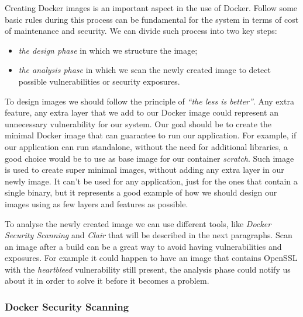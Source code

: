 \documentclass[a4paper,12pt]{article}
\begin{document}
Creating Docker images is an important aspect in the use of Docker. Follow
some basic rules during this process can be fundamental for the system in terms
of cost of maintenance and security. We can divide such process into two key
steps: 
\begin{itemize}
  \item \textit{the design phase} in which we structure the image;
  \item \textit{the analysis phase} in which we scan the newly created image to
  detect possible vulnerabilities or security exposures.
\end{itemize}
To design images we should follow the principle of \textit{``the less is
better''}. Any extra feature, any extra layer that we add to our Docker image
could represent an unnecessary vulnerability for our system. Our goal should be
to create the minimal Docker image that can guarantee to run our application.
For example, if our application can run standalone, without the need for
additional libraries, a good choice would be to use as base image for our
container \textit{scratch}. Such image is used to create super minimal images,
without adding any extra layer in our newly image. It can't be used for any
application, just for the ones that contain a single binary, but it represents a
good example of how we should design our images using as few layers and features
as possible. \par To analyse the newly created image we can use different tools,
like \textit{Docker Security Scanning} and \textit{Clair} that will be described
in the next paragraphs. Scan an image after a build can be a great way to avoid
having vulnerabilities and exposures. For example it could happen to have an
image that contains OpenSSL with the \textit{heartbleed} vulnerability still
present, the analysis phase could notify us about it in order to solve it before
it becomes a problem. 

\subsubsection{Docker Security Scanning}
\end{document}
